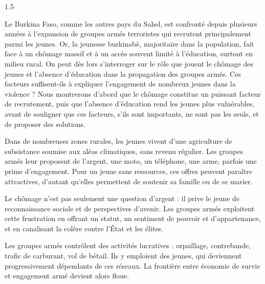 \documentclass[12pt]{article}
\begin{document}
\begin{spacing}{1.5}


Le Burkina Faso, comme les autres pays du Sahel, est confronté depuis plusieurs années à l'expansion de groupes armés terroristes qui recrutent principalement parmi les jeunes. Or, la jeunesse burkinabè, majoritaire dans la population, fait face à un chômage massif et à un accès souvent limité à l'éducation, surtout en milieu rural. On peut dès lors s'interroger sur le rôle que jouent le chômage des jeunes et l'absence d'éducation dans la propagation des groupes armés. Ces facteurs suffisent-ils à expliquer l'engagement de nombreux jeunes dans la violence ? Nous montrerons d'abord que le chômage constitue un puissant facteur de recrutement, puis que l'absence d'éducation rend les jeunes plus vulnérables, avant de souligner que ces facteurs, s'ils sont importants, ne sont pas les seuls, et de proposer des solutions.


Dans de nombreuses zones rurales, les jeunes vivent d'une agriculture de subsistance soumise aux aléas climatiques, sans revenu régulier. Les groupes armés leur proposent de l'argent, une moto, un téléphone, une arme, parfois une prime d'engagement. Pour un jeune sans ressources, ces offres peuvent paraître attractives, d'autant qu'elles permettent de soutenir sa famille ou de se marier.

Le chômage n'est pas seulement une question d'argent : il prive le jeune de reconnaissance sociale et de perspectives d'avenir. Les groupes armés exploitent cette frustration en offrant un statut, un sentiment de pouvoir et d'appartenance, et en canalisant la colère contre l'État et les élites.

Les groupes armés contrôlent des activités lucratives : orpaillage, contrebande, trafic de carburant, vol de bétail. Ils y emploient des jeunes, qui deviennent progressivement dépendants de ces réseaux. La frontière entre économie de survie et engagement armé devient alors floue.




\end{spacing}
\end{document}
